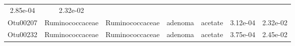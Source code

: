 \documentclass[11pt,]{article}
\begin{document}
\begin{longtable}[]{@{}ccccccc@{}}
\begin{minipage}[t]{0.09\columnwidth}
2.85e-04\strut
\end{minipage} & \begin{minipage}[t]{0.09\columnwidth}\centering\strut
2.32e-02\strut
\end{minipage}\tabularnewline
\begin{minipage}[t]{0.09\columnwidth}\centering\strut
Otu00207\strut
\end{minipage} & \begin{minipage}[t]{0.17\columnwidth}\centering\strut
Ruminococcaceae\strut
\end{minipage} & \begin{minipage}[t]{0.17\columnwidth}\centering\strut
Ruminococcaceae\strut
\end{minipage} & \begin{minipage}[t]{0.09\columnwidth}\centering\strut
adenoma\strut
\end{minipage} & \begin{minipage}[t]{0.11\columnwidth}\centering\strut
acetate\strut
\end{minipage} & \begin{minipage}[t]{0.09\columnwidth}\centering\strut
3.12e-04\strut
\end{minipage} & \begin{minipage}[t]{0.09\columnwidth}\centering\strut
2.32e-02\strut
\end{minipage}\tabularnewline
\begin{minipage}[t]{0.09\columnwidth}\centering\strut
Otu00232\strut
\end{minipage} & \begin{minipage}[t]{0.17\columnwidth}\centering\strut
Ruminococcaceae\strut
\end{minipage} & \begin{minipage}[t]{0.17\columnwidth}\centering\strut
Ruminococcaceae\strut
\end{minipage} & \begin{minipage}[t]{0.09\columnwidth}\centering\strut
adenoma\strut
\end{minipage} & \begin{minipage}[t]{0.11\columnwidth}\centering\strut
acetate\strut
\end{minipage} & \begin{minipage}[t]{0.09\columnwidth}\centering\strut
3.75e-04\strut
\end{minipage} & \begin{minipage}[t]{0.09\columnwidth}\centering\strut
2.45e-02\strut
\end{minipage}\tabularnewline

\end{longtable}
\end{document}
